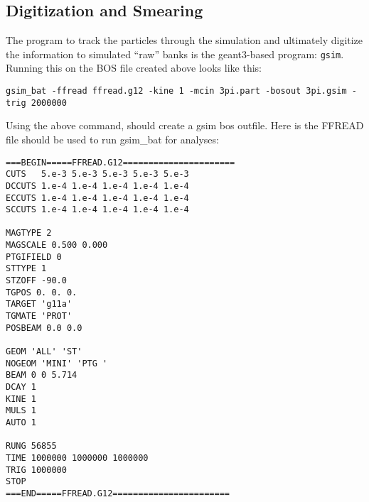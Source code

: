 \subsection{\label{sec:sim.digit}Digitization and Smearing}

The program to track the particles through the simulation and ultimately digitize the information to simulated ``raw'' banks is the geant3-based program: \texttt{gsim}. Running this on the BOS file created above looks like this:
\begin{verbatim}
gsim_bat -ffread ffread.g12 -kine 1 -mcin 3pi.part -bosout 3pi.gsim -trig 2000000
\end{verbatim}
Using the above command, should create a gsim bos outfile. Here is the FFREAD file should be used to run gsim\_bat for  analyses:
\begin{verbatim}
===BEGIN=====FFREAD.G12======================
CUTS   5.e-3 5.e-3 5.e-3 5.e-3 5.e-3
DCCUTS 1.e-4 1.e-4 1.e-4 1.e-4 1.e-4
ECCUTS 1.e-4 1.e-4 1.e-4 1.e-4 1.e-4
SCCUTS 1.e-4 1.e-4 1.e-4 1.e-4 1.e-4

MAGTYPE 2
MAGSCALE 0.500 0.000
PTGIFIELD 0
STTYPE 1
STZOFF -90.0
TGPOS 0. 0. 0.
TARGET 'g11a'
TGMATE 'PROT'
POSBEAM 0.0 0.0

GEOM 'ALL' 'ST'
NOGEOM 'MINI' 'PTG '
BEAM 0 0 5.714
DCAY 1
KINE 1
MULS 1
AUTO 1

RUNG 56855
TIME 1000000 1000000 1000000
TRIG 1000000
STOP
===END=====FFREAD.G12=======================
\end{verbatim}

